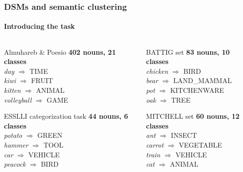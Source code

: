 \documentclass[t]{beamer} %
\begin{document}
\begin{frame}
  \frametitle{DSMs and semantic clustering}
  \framesubtitle{Introducing the task}

  \ungap[1.5]
  \begin{columns}
    \begin{column}{0.5 \textwidth}
      \begin{exampleblock}{Almuhareb \& Poesio}
        \textbf{402 nouns, 21 classes} \\
        \textit{day} $\Longrightarrow$ \textsc{TIME}   \\
        \textit{kiwi} $\Longrightarrow$ \textsc{FRUIT}  \\
        \textit{kitten} $\Longrightarrow$ \textsc{ANIMAL} \\
        \textit{volleyball} $\Longrightarrow$ \textsc{GAME}
      \end{exampleblock}
      \begin{exampleblock}{ESSLLI categorization task}
        \textbf{44 nouns, 6 classes} \\
        \textit{potato} $\Longrightarrow$ \textsc{GREEN}  \\
        \textit{hammer} $\Longrightarrow$ \textsc{TOOL}  \\
        \textit{car} $\Longrightarrow$ \textsc{VEHICLE} \\
        \textit{peacock} $\Longrightarrow$ \textsc{BIRD}     
      \end{exampleblock}
    \end{column}
    \begin{column}{0.5 \textwidth}
      \begin{exampleblock}{BATTIG set}
        \textbf{83 nouns, 10 classes} \\
        \textit{chicken} $\Longrightarrow$ \textsc{BIRD}   \\
        \textit{bear} $\Longrightarrow$ \textsc{LAND\_MAMMAL}  \\
        \textit{pot} $\Longrightarrow$ \textsc{KITCHENWARE} \\
        \textit{oak} $\Longrightarrow$ \textsc{TREE} 
      \end{exampleblock}
      \begin{exampleblock}{MITCHELL set}
        \textbf{60 nouns, 12 classes} \\
        \textit{ant} $\Longrightarrow$ \textsc{INSECT}   \\
        \textit{carrot} $\Longrightarrow$ \textsc{VEGETABLE}  \\
        \textit{train} $\Longrightarrow$ \textsc{VEHICLE} \\
        \textit{cat} $\Longrightarrow$ \textsc{ANIMAL}
      \end{exampleblock}
    \end{column}
  \end{columns}
\end{frame}
\end{document}
